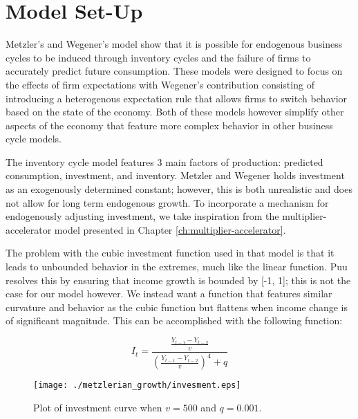 \section{Model Set-Up}
Metzler's and Wegener's model show that it is possible for endogenous business cycles to be induced through inventory cycles and the failure of firms to accurately predict future consumption. These models were designed to focus on the effects of firm expectations with Wegener's contribution consisting of introducing a heterogenous expectation rule that allows firms to switch behavior based on the state of the economy. Both of these models however simplify other aspects of the economy that feature more complex behavior in other business cycle models.

The inventory cycle model features 3 main factors of production: predicted consumption, investment, and inventory. Metzler and Wegener holds investment as an exogenously determined constant; however, this is both unrealistic and does not allow for long term endogenous growth. To incorporate a mechanism for endogenously adjusting investment, we take inspiration from the multiplier-accelerator model presented in Chapter \ref{ch:multiplier-accelerator}. 

The problem with the cubic investment function used in that model is that it leads to unbounded behavior in the extremes, much like the linear function. Puu resolves this by ensuring that income growth is bounded by [-1, 1]; this is not the case for our model however. We instead want a function that features similar curvature and behavior as the cubic function but flattens when income change is of significant magnitude. This can be accomplished with the following function:

\begin{equation}
    I_t = \frac{\frac{Y_{t-1}-Y_{t-2}}{v}}{(\frac{Y_{t-1}-Y_{t-2}}{v})^4+q}	
\end{equation}
\begin{figure}
    \centering
    \texttt{[image: ./metzlerian\_growth/invesment.eps]}
    \caption{Plot of investment curve when $v=500$ and $q=0.001$.}
    \label{metzlerian_growth-investment}
\end{figure}

